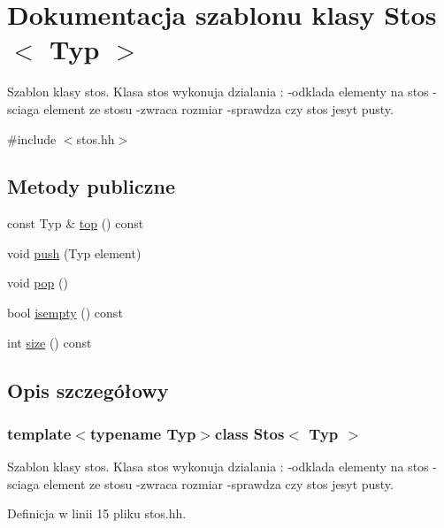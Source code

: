 \hypertarget{class_stos}{\section{Dokumentacja szablonu klasy Stos$<$ Typ $>$}
\label{class_stos}
}


Szablon klasy stos. Klasa stos wykonuja dzialania \-: -\/odklada elementy na stos -\/sciaga element ze stosu -\/zwraca rozmiar -\/sprawdza czy stos jesyt pusty.  




{\ttfamily \#include $<$stos.\-hh$>$}

\subsection*{Metody publiczne}
\begin{DoxyCompactItemize}
\item 
const Typ \& \hyperlink{class_stos_a07d6df2e59cdfdac65d8f793777ff463}{top} () const 
\item 
void \hyperlink{class_stos_ae288acf023c8a1c25184dc5c6a57ee2a}{push} (Typ element)
\item 
void \hyperlink{class_stos_a38e84abe604aa6d1e9b9c6ac524a33bc}{pop} ()
\item 
bool \hyperlink{class_stos_a70aadb72c5b4728dc0c4b1e1adaa868e}{isempty} () const 
\item 
int \hyperlink{class_stos_a472d836bf51faa0264fefd08eb4224d6}{size} () const 
\end{DoxyCompactItemize}


\subsection{Opis szczegółowy}
\subsubsection*{template$<$typename Typ$>$class Stos$<$ Typ $>$}

Szablon klasy stos. Klasa stos wykonuja dzialania \-: -\/odklada elementy na stos -\/sciaga element ze stosu -\/zwraca rozmiar -\/sprawdza czy stos jesyt pusty. 



Definicja w linii 15 pliku stos.\-hh.



